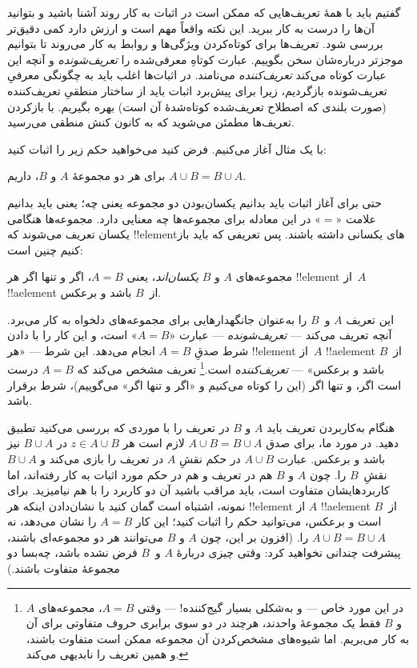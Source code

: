 \documentclass[../../../include/open-logic-section]{subfiles}
\begin{document}


گفتیم باید با همهٔ تعریف‌هایی که ممکن است در اثبات به کار روند آشنا
باشید و بتوانید آن‌ها را درست به کار ببرید. این نکته واقعاً مهم است
و ارزش دارد کمی دقیق‌تر بررسی شود. تعریف‌ها برای کوتاه‌کردن
ویژگی‌ها و روابط به کار می‌روند تا بتوانیم موجزتر درباره‌شان سخن
بگوییم. عبارت کوتاهِ معرفی‌شده را \emph{تعریف‌شونده} و آنچه این
عبارت کوتاه می‌کند \emph{تعریف‌کننده} می‌نامند. در اثبات‌ها اغلب
باید به چگونگی معرفیِ تعریف‌شونده بازگردیم، زیرا برای پیش‌برد اثبات
باید از ساختار منطقیِ تعریف‌کننده (صورت بلندی که اصطلاح تعریف‌شده کوتاه‌شدهٔ آن است)
بهره بگیریم. با بازکردن تعریف‌ها مطمئن می‌شوید که به کانون کنش
منطقی می‌رسید.

با یک مثال آغاز می‌کنیم. فرض کنید می‌خواهید حکم زیر را اثبات کنید:

\begin{prop}
برای هر دو مجموعهٔ $A$ و $B$، داریم $A \cup B = B \cup A$.
\end{prop}

حتی برای آغاز اثبات باید بدانیم یکسان‌بودن دو مجموعه یعنی چه؛ یعنی
باید بدانیم علامت «$=$» در این معادله برای مجموعه‌ها چه معنایی
دارد. مجموعه‌ها هنگامی یکسان تعریف می‌شوند که !!{element}های
یکسانی داشته باشند. پس تعریفی که باید باز کنیم چنین است:

\begin{defn}
مجموعه‌های $A$ و $B$ \emph{یکسان‌اند}، یعنی $A = B$، اگر و تنها
اگر هر !!{element} از~$A$ !!a{element} از~$B$ باشد و برعکس.
\end{defn}

این تعریف $A$ و~$B$ را به‌عنوان جانگهدارهایی برای مجموعه‌های دلخواه
به کار می‌برد. آنچه تعریف می‌کند — \emph{تعریف‌شونده} — عبارت
«$A = B$» است، و این کار را با دادن شرط صدقِ $A = B$ انجام می‌دهد.
این شرط — «هر !!{element} از~$A$ !!a{element} از~$B$ باشد و
برعکس» — \emph{تعریف‌کننده} است.\footnote{در این مورد خاص — و به‌شکلی
بسیار گیج‌کننده! — وقتی $A = B$، مجموعه‌های $A$ و $B$ فقط یک
مجموعهٔ واحدند، هرچند در دو سوی برابری حروف متفاوتی برای آن به کار
می‌بریم. اما شیوه‌های مشخص‌کردن آن مجموعه ممکن است متفاوت باشند، و
همین تعریف را نابدیهی می‌کند.} تعریف مشخص می‌کند که
$A = B$ درست است اگر، و تنها اگر (این را کوتاه می‌کنیم و
«اگر و تنها اگر» می‌گوییم)، شرط برقرار باشد.

هنگام به‌کاربردن تعریف باید $A$ و $B$ در تعریف را با موردی که
بررسی می‌کنید تطبیق دهید. در مورد ما، برای صدق
$A \cup B = B \cup A$ لازم است هر $z \in A \cup B$ در
$B \cup A$ نیز باشد و برعکس. عبارت $A \cup B$ در حکم نقشِ $A$ در
تعریف را بازی می‌کند و $B \cup A$ نقشِ~$B$ را. چون $A$ و $B$ هم
در تعریف و هم در حکم مورد اثبات به کار رفته‌اند، اما کاربردهایشان
متفاوت است، باید مراقب باشید آن دو کاربرد را با هم نیامیزید. برای
نمونه، اشتباه است گمان کنید با نشان‌دادن اینکه هر !!{element} از
$A$ !!a{element} از~$B$ است و برعکس، می‌توانید حکم را اثبات کنید؛
این کار $A = B$ را نشان می‌دهد، نه
$A \cup B = B \cup A$ را. (افزون بر این، چون $A$ و $B$ می‌توانند
هر دو مجموعه‌ای باشند، پیشرفت چندانی نخواهید کرد: وقتی چیزی دربارهٔ
$A$ و~$B$ فرض نشده باشد، چه‌بسا دو مجموعهٔ متفاوت باشند.)
\end{document}
